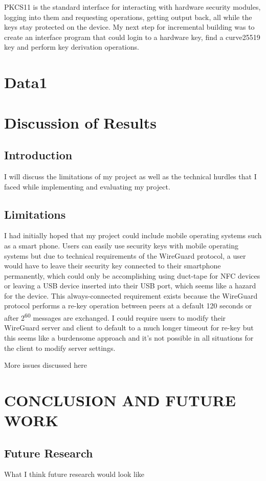 \documentclass [11pt, proquest] {uwthesis}[2020/02/24]
\begin{document}
PKCS11 is the standard interface for interacting with hardware security modules, logging into them and requesting operations, getting output back, all while the keys stay protected on the device.
My next step for incremental building was to create an interface program that could login to a hardware key, find a curve25519 key and perform key derivation operations.

\chapter {Data1}

\chapter {Discussion of Results}
\section {Introduction}
I will discuss the limitations of my project as well as the technical hurdles that I faced while implementing and evaluating my project.

\section {Limitations}
I had initially hoped that my project could include mobile operating systems such as a smart phone. Users can easily use security keys
with mobile operating systems but due to technical requirements of the WireGuard protocol, a user would have to leave their security key connected
to their smartphone permanently, which could only be accomplishing using duct-tape for NFC devices or leaving a USB device inserted into their USB port, which 
seems like a hazard for the device. This always-connected requirement exists because the WireGuard protocol performs a re-key operation between peers at a default 120 seconds 
or after 2\textsuperscript{60} messages are exchanged. I could require users to modify their WireGuard server and client to default to a much longer 
timeout for re-key but this seems like a burdensome approach and it's not possible in all situations for the client to modify server settings.

More issues discussed here 


\chapter {CONCLUSION AND FUTURE WORK}


\section {Future Research}
What I think future research would look like



\end{document}

